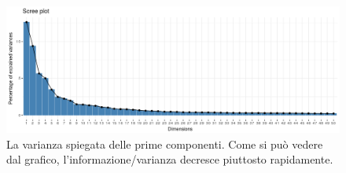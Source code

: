 \documentclass[12pt]{report}
\begin{document}
\begin{figure}[hp!]
\centering
\includegraphics[scale=0.5]{./images/explained_variance.png}
\caption{\footnotesize{La varianza spiegata delle prime componenti. Come si può vedere dal grafico, l'informazione/varianza decresce piuttosto rapidamente.}}
\label{varianceexplained}
\end{figure} 
\end{document}
